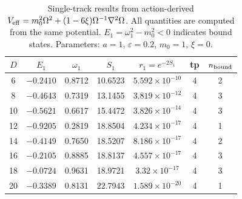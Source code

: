 \begin{table}[htbp]
\centering
\caption{Single-track results from action-derived $V_{\rm eff} = m_0^2\Omega^2 + (1-6\xi)\Omega^{-1}\nabla^2\Omega$. All quantities are computed from the same potential. $E_1 = \omega_1^2 - m_0^2 < 0$ indicates bound states. Parameters: $a = 1$, $\varepsilon = 0.2$, $m_0 = 1$, $\xi = 0$.}
\label{tab:true_unified}
\begin{tabular}{ccccccc}
\hline\hline
$D$ & $E_1$ & $\omega_1$ & $S_1$ & $r_1 = e^{-2S_1}$ & tp & $n_{\rm bound}$ \\
\hline
6  & $-0.2410$ & 0.8712 & 10.6523 & $5.592 \times 10^{-10}$ & 4 & 2 \\
8  & $-0.4643$ & 0.7319 & 13.1455 & $3.819 \times 10^{-12}$ & 4 & 3 \\
10  & $-0.5621$ & 0.6617 & 15.4472 & $3.826 \times 10^{-14}$ & 4 & 3 \\
12  & $-0.9205$ & 0.2819 & 18.8504 & $4.234 \times 10^{-17}$ & 4 & 1 \\
14  & $-0.4149$ & 0.7650 & 18.5207 & $8.186 \times 10^{-17}$ & 4 & 2 \\
16  & $-0.2105$ & 0.8885 & 18.8137 & $4.557 \times 10^{-17}$ & 4 & 3 \\
18  & $-0.0724$ & 0.9631 & 18.9721 & $3.32 \times 10^{-17}$ & 4 & 3 \\
20  & $-0.3389$ & 0.8131 & 22.7943 & $1.589 \times 10^{-20}$ & 4 & 1 \\
\hline\hline
\end{tabular}
\end{table}
